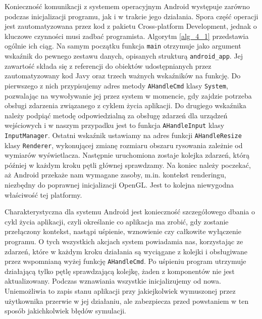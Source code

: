 		Konieczność komunikacji z systemem operacyjnym Android występuje zarówno podczas inicjalizacji programu, jak i w trakcie jego działania. Spora część operacji jest zautomatyzowana przez kod z pakietu Cross-platform Development, jednak o kluczowe czynności musi zadbać programista. Algorytm \ref{alg_4_1} przedstawia ogólnie ich ciąg. Na samym początku funkcja \texttt{main} otrzymuje jako argument wskaźnik do pewnego zestawu danych, opisanych strukturą \texttt{android\_app}. Jej zawartość składa się z referencji do obiektów udostępnianych przez zautomatyzowany kod Javy oraz trzech ważnych wskaźników na funkcję. Do pierwszego z nich przypisujemy adres metody \texttt{AHandleCmd} klasy \texttt{System}, pozwalając na wywoływanie jej przez system w momencie, gdy zajdzie potrzeba obsługi zdarzenia związanego z cyklem życia aplikacji. Do drugiego wskaźnika należy podpiąć metodę odpowiedzialną za obsługę zdarzeń dla urządzeń wejściowych i w naszym przypadku jest to funkcja \texttt{AHandleInput} klasy \texttt{InputManager}. Ostatni wskaźnik ustawiamy na adres funkcji \texttt{AHandleResize} klasy \texttt{Renderer}, wykonującej zmianę rozmiaru obszaru rysowania zależnie od wymiarów wyświetlacza. Następnie uruchomiona zostaje kolejka zdarzeń, którą później w każdym kroku pętli głównej sprawdzamy. Na koniec należy poczekać, aż Android przekaże nam wymagane zasoby, m.in. kontekst renderingu, niezbędny do poprawnej inicjalizacji OpenGL. Jest to kolejna niewygodna właściwość tej platformy.
		
		Charakterystyczna dla systemu Android jest konieczność szczegółowego dbania o cykl życia aplikacji, czyli określanie co aplikacja ma zrobić, gdy zostanie przełączony kontekst, nastąpi uśpienie, wznowienie czy całkowite wyłączenie programu. O tych wszystkich akcjach system powiadamia nas, korzystając ze zdarzeń, które w każdym kroku działania są wyciągane z kolejki i obsługiwane przez wspomnianą wyżej funkcję \texttt{AHandleCmd}. Po uśpieniu program utrzymuje działającą tylko pętlę sprawdzającą kolejkę, żaden z komponentów nie jest aktualizowany. Podczas wznawiania wszystkie inicjalizujemy od nowa. Uniemożliwia to zapis stanu aplikacji przy jakiejkolwiek wymuszonej przez użytkownika przerwie w jej działaniu, ale zabezpiecza przed powstaniem w ten sposób jakichkolwiek błędów symulacji.
		
